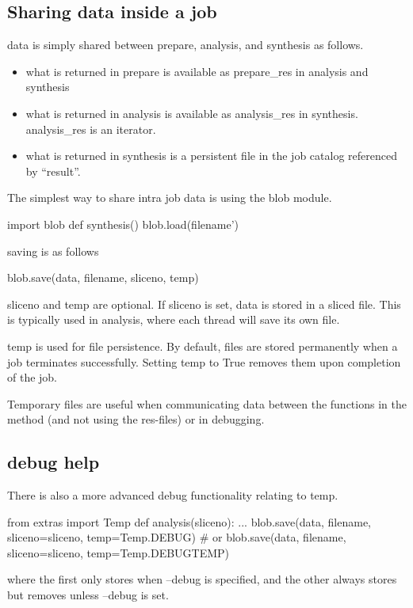 \subsection{Sharing data inside a job}
data is simply shared between prepare, analysis, and synthesis as follows.
\begin{itemize}
\item what is returned in prepare is available as prepare\_res in analysis and synthesis
\item what is returned in analysis is available as analysis\_res in synthesis.  analysis\_res is an iterator.
\item what is returned in synthesis is a persistent file in the job catalog referenced by ``result''.
\end{itemize}

The simplest way to share intra job data is using the blob module.

\begin{python}
import blob
def synthesis()
  blob.load(filename')
\end{python}

saving is as follows

\begin{python}
  blob.save(data, filename, sliceno, temp)
\end{python}
sliceno and temp are optional.  If sliceno is set, data is stored in a
sliced file.  This is typically used in analysis, where each thread
will save its own file.

temp is used for file persistence.  By default, files are stored
permanently when a job terminates successfully.  Setting temp to True
removes them upon completion of the job.

Temporary files are useful when communicating data between the
functions in the method (and not using the res-files) or in debugging.


\subsection{debug help}
There is also a more advanced debug functionality relating to temp.

\begin{python}
from extras import Temp
def analysis(sliceno):
  ...
  blob.save(data, filename, sliceno=sliceno, temp=Temp.DEBUG)
  # or
  blob.save(data, filename, sliceno=sliceno, temp=Temp.DEBUGTEMP)
\end{python}
where the first only stores when --debug is specified, and the other
always stores but removes unless --debug is set.


